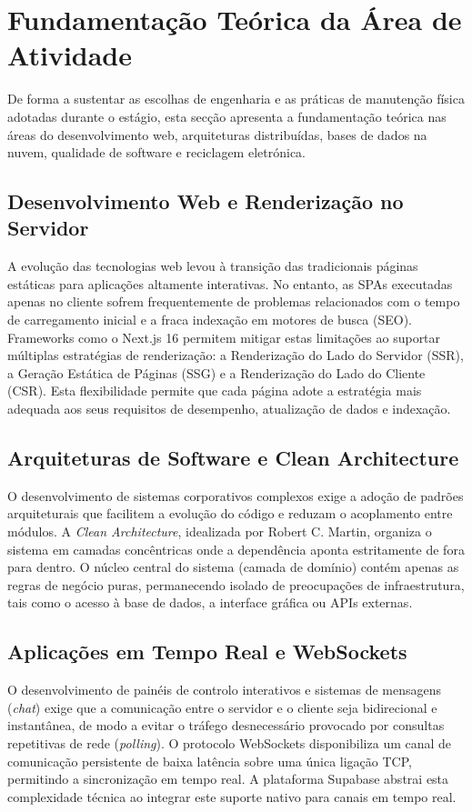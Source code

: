 \section{Fundamentação Teórica da Área de Atividade}

De forma a sustentar as escolhas de engenharia e as práticas de manutenção física adotadas durante o estágio, esta secção apresenta a fundamentação teórica nas áreas do desenvolvimento web, arquiteturas distribuídas, bases de dados na nuvem, qualidade de software e reciclagem eletrónica.

\subsection{Desenvolvimento Web e Renderização no Servidor}
A evolução das tecnologias web levou à transição das tradicionais páginas estáticas para aplicações altamente interativas. No entanto, as \acp{SPA} executadas apenas no cliente sofrem frequentemente de problemas relacionados com o tempo de carregamento inicial e a fraca indexação em motores de busca (\ac{SEO}). Frameworks como o Next.js 16 permitem mitigar estas limitações ao suportar múltiplas estratégias de renderização: a Renderização do Lado do Servidor (\ac{SSR}), a Geração Estática de Páginas (\ac{SSG}) e a Renderização do Lado do Cliente (\ac{CSR}). Esta flexibilidade permite que cada página adote a estratégia mais adequada aos seus requisitos de desempenho, atualização de dados e indexação.

\subsection{Arquiteturas de Software e Clean Architecture}
O desenvolvimento de sistemas corporativos complexos exige a adoção de padrões arquiteturais que facilitem a evolução do código e reduzam o acoplamento entre módulos. A \textit{Clean Architecture}, idealizada por Robert C. Martin, organiza o sistema em camadas concêntricas onde a dependência aponta estritamente de fora para dentro. O núcleo central do sistema (camada de domínio) contém apenas as regras de negócio puras, permanecendo isolado de preocupações de infraestrutura, tais como o acesso à base de dados, a interface gráfica ou APIs externas.

\subsection{Aplicações em Tempo Real e WebSockets}
O desenvolvimento de painéis de controlo interativos e sistemas de mensagens (\textit{chat}) exige que a comunicação entre o servidor e o cliente seja bidirecional e instantânea, de modo a evitar o tráfego desnecessário provocado por consultas repetitivas de rede (\textit{polling}). O protocolo WebSockets disponibiliza um canal de comunicação persistente de baixa latência sobre uma única ligação TCP, permitindo a sincronização em tempo real. A plataforma Supabase abstrai esta complexidade técnica ao integrar este suporte nativo para canais em tempo real.

